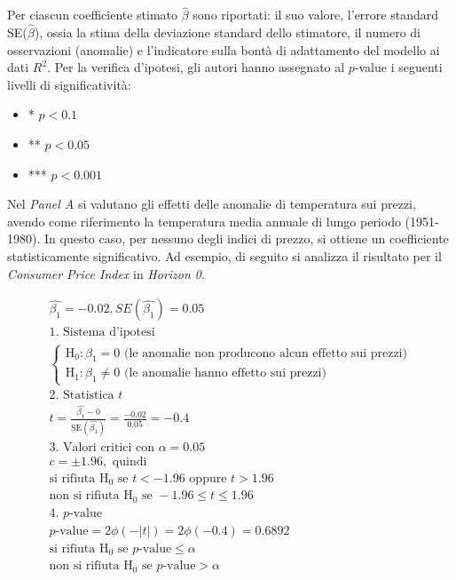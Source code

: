 Per ciascun coefficiente stimato $\hat{\beta}$ sono riportati: il suo valore, l'errore standard SE($\hat{\beta}$), ossia la stima della deviazione standard dello stimatore, il numero di osservazioni (anomalie) e l'indicatore sulla bontà di adattamento del modello ai dati $R^2$. Per la verifica d'ipotesi, gli autori hanno assegnato al $p$-value i seguenti livelli di significatività:

\begin{itemize}
	\item * $p<0.1$
	\item ** $p<0.05$
	\item *** $p<0.001$
\end{itemize}

Nel \textit{Panel A} si valutano gli effetti delle anomalie di temperatura sui prezzi, avendo come riferimento la temperatura media annuale di lungo periodo (1951-1980). In questo caso, per nessuno degli indici di prezzo, si ottiene un coefficiente statisticamente significativo. Ad esempio, di seguito si analizza il risultato per il \textit{Consumer Price Index} in \textit{Horizon 0}.\par

\vspace{-1em}

\begin{gather}
	\hat{\beta_1}=-0.02, SE(\hat{\beta_1})=0.05\\
	\nonumber \text{1. Sistema d'ipotesi}\\
	\nonumber \begin{cases}
		\text{H}_0:\beta_1=0 \text{ (le anomalie non producono alcun effetto sui prezzi)}\\
		\text{H}_1:\beta_1\neq0 \text{ (le anomalie hanno effetto sui prezzi)}
	\end{cases}\\
	\nonumber \text{2. Statistica }t\\
	\nonumber t=\frac{\hat{\beta_1}-0}{\text{SE}(\hat{\beta_1})} = \frac{-0.02}{0.05}=-0.4\\
	\nonumber \text{3. Valori critici con }\alpha=0.05\\
	\nonumber c=\pm1.96,\text{ quindi}\\
	\nonumber \text{si rifiuta H}_0 \text{ se }t<-1.96 \text{ oppure } t>1.96\\
	\nonumber \text{non si rifiuta H}_0 \text{ se }-1.96\le t\le 1.96\\
	\nonumber \text{4. }p \text{-value}\\
	\nonumber p\text{-value}=2\phi(-|t|)=2\phi(-0.4)=0.6892\\
	\nonumber \text{si rifiuta H}_0 \text{ se }p\text{-value} \le \alpha\\
	\nonumber \text{non si rifiuta H}_0 \text{ se }p\text{-value} > \alpha
\end{gather}

